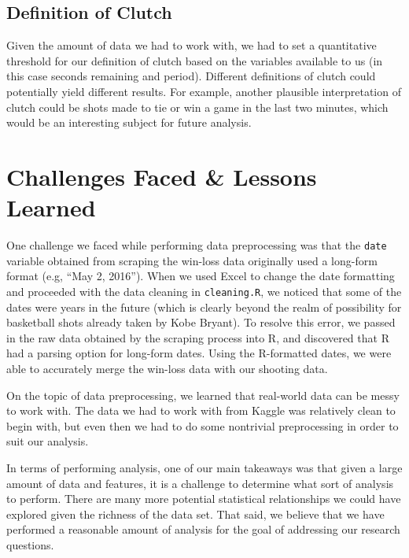 \documentclass[paper=a4, fontsize=11pt]{scrartcl} %
\numberwithin{equation}{section} %
\numberwithin{figure}{section} %
\numberwithin{table}{section} %
\begin{document}
\subsection{Definition of Clutch}
\hspace*{1cm}Given the amount of data we had to work with, we had to set a quantitative threshold for our definition of clutch based on the variables available to us (in this case seconds remaining and period). Different definitions of clutch could potentially yield different results. For example, another plausible interpretation of clutch could be shots made to tie or win a game in the last two minutes, which would be an interesting subject for future analysis.

\section{Challenges Faced \& Lessons Learned}
\hspace*{1cm}One challenge we faced while performing data preprocessing was that the \texttt{date} variable obtained from scraping the win-loss data originally used a long-form format (e.g, ``May 2, 2016''). When we used Excel to change the date formatting and proceeded with the data cleaning in \texttt{cleaning.R}, we noticed that some of the dates were years in the future (which is clearly beyond the realm of possibility for basketball shots already taken by Kobe Bryant). To resolve this error, we passed in the raw data obtained by the scraping process into R, and discovered that R had a parsing option for long-form dates. Using the R-formatted dates, we were able to accurately merge the win-loss data with our shooting data. 

\hspace*{1cm}On the topic of data preprocessing, we learned that real-world data can be messy to work with. The data we had to work with from Kaggle was relatively clean to begin with, but even then we had to do some nontrivial preprocessing in order to suit our analysis.

\hspace*{1cm}In terms of performing analysis, one of our main takeaways was that given a large amount of data and features, it is a challenge to determine what sort of analysis to perform. There are many more potential statistical relationships we could have explored given the richness of the data set. That said, we believe that we have performed a reasonable amount of analysis for the goal of addressing our research questions.
\end{document}
